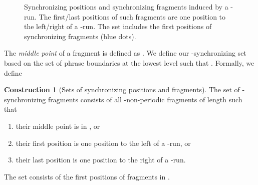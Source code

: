 \documentclass[a4paper]{article}
\theoremstyle{definition}
\newtheorem{construction}[theorem]{Construction}
\theoremstyle{remark}
\begin{document}
\begin{figure}[h]
\centering
{}
 \caption{Synchronizing positions and synchronizing fragments induced by a -run.
The first/last positions of such fragments are one position to the left/right of a -run. The set  includes the first positions
of synchronizing fragments (blue dots).}\label{Sept23}
\end{figure}

The \emph{middle point} of a fragment  is defined as . 
We define our -synchronizing set based on the set  of phrase boundaries at the lowest level 
 such that . Formally, we define 

\begin{construction}[Sets of synchronizing positions and fragments]\label{def:syncfr}
The set  of -synchronizing fragments consists of all -non-periodic 
fragments of length  such that 
\begin{enumerate}[label=(\alph*)]
\item\label{it:a} their middle point is in , or
\item\label{it:b} their first position is one position to the left of a -run, or
\item\label{it:c} their last position is one position to the right of a -run.
\end{enumerate}
The set  consists of the first positions
of fragments in .
\end{construction}
\end{document}
